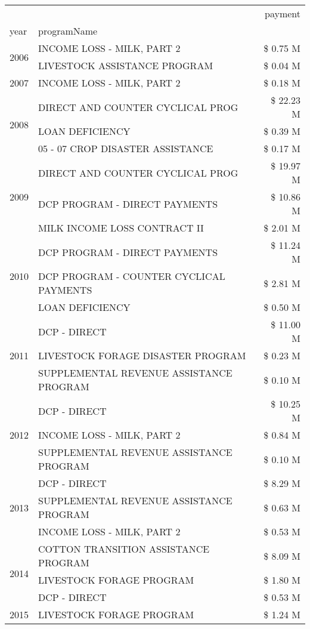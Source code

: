 \begin{tabular}{llr}
\toprule
 &  & payment \\
year & programName &  \\
\midrule
\multirow[t]{2}{*}{2006} & INCOME LOSS - MILK, PART 2 & \$ 0.75 M \\
 & LIVESTOCK ASSISTANCE PROGRAM & \$ 0.04 M \\
\cline{1-3}
2007 & INCOME LOSS - MILK, PART 2 & \$ 0.18 M \\
\cline{1-3}
\multirow[t]{3}{*}{2008} & DIRECT AND COUNTER CYCLICAL PROG & \$ 22.23 M \\
 & LOAN DEFICIENCY & \$ 0.39 M \\
 & 05 - 07 CROP DISASTER ASSISTANCE & \$ 0.17 M \\
\cline{1-3}
\multirow[t]{3}{*}{2009} & DIRECT AND COUNTER CYCLICAL PROG & \$ 19.97 M \\
 & DCP PROGRAM - DIRECT PAYMENTS & \$ 10.86 M \\
 & MILK INCOME LOSS CONTRACT II & \$ 2.01 M \\
\cline{1-3}
\multirow[t]{3}{*}{2010} & DCP PROGRAM - DIRECT PAYMENTS & \$ 11.24 M \\
 & DCP PROGRAM - COUNTER CYCLICAL PAYMENTS & \$ 2.81 M \\
 & LOAN DEFICIENCY & \$ 0.50 M \\
\cline{1-3}
\multirow[t]{3}{*}{2011} & DCP - DIRECT & \$ 11.00 M \\
 & LIVESTOCK FORAGE DISASTER PROGRAM & \$ 0.23 M \\
 & SUPPLEMENTAL REVENUE ASSISTANCE PROGRAM & \$ 0.10 M \\
\cline{1-3}
\multirow[t]{3}{*}{2012} & DCP - DIRECT & \$ 10.25 M \\
 & INCOME LOSS - MILK, PART 2 & \$ 0.84 M \\
 & SUPPLEMENTAL REVENUE ASSISTANCE PROGRAM & \$ 0.10 M \\
\cline{1-3}
\multirow[t]{3}{*}{2013} & DCP - DIRECT & \$ 8.29 M \\
 & SUPPLEMENTAL REVENUE ASSISTANCE PROGRAM & \$ 0.63 M \\
 & INCOME LOSS - MILK, PART 2 & \$ 0.53 M \\
\cline{1-3}
\multirow[t]{3}{*}{2014} & COTTON TRANSITION ASSISTANCE PROGRAM & \$ 8.09 M \\
 & LIVESTOCK FORAGE PROGRAM & \$ 1.80 M \\
 & DCP - DIRECT & \$ 0.53 M \\
\cline{1-3}
\multirow[t]{3}{*}{2015} & LIVESTOCK FORAGE PROGRAM & \$ 1.24 M \\

\end{tabular}
